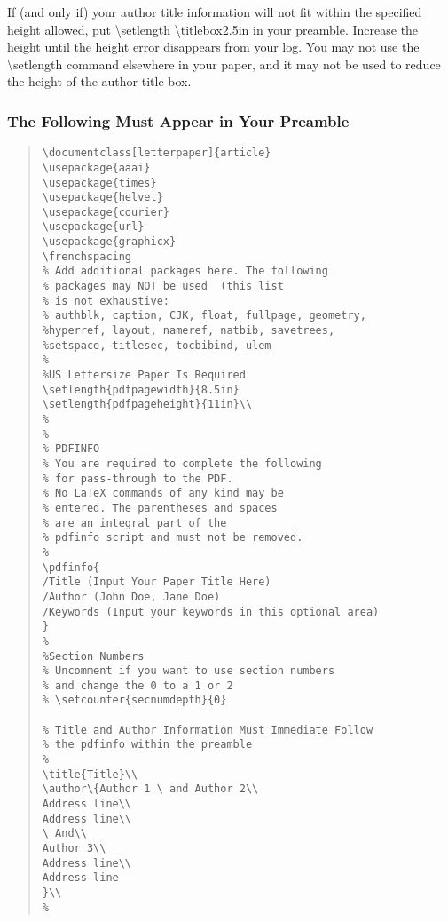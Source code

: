 \documentclass[letterpaper]{article} %
\begin{document}
If (and only if) your author title information will not fit within the specified  height allowed, put \textbackslash setlength \textbackslash titlebox{2.5in} in your preamble. Increase the height until the height error disappears from your log. You may not use the  \textbackslash setlength command elsewhere in your paper, and it may not be used to reduce the height of the author-title box.

\subsubsection{The Following Must Appear in Your Preamble}
\begin{quote}
\begin{scriptsize}\begin{verbatim}
\documentclass[letterpaper]{article}
\usepackage{aaai}
\usepackage{times}
\usepackage{helvet}
\usepackage{courier}
\usepackage{url}
\usepackage{graphicx}
\frenchspacing
% Add additional packages here. The following
% packages may NOT be used  (this list
% is not exhaustive:
% authblk, caption, CJK, float, fullpage, geometry,
%hyperref, layout, nameref, natbib, savetrees,
%setspace, titlesec, tocbibind, ulem
%
%US Lettersize Paper Is Required
\setlength{pdfpagewidth}{8.5in}
\setlength{pdfpageheight}{11in}\\
%
%
% PDFINFO
% You are required to complete the following
% for pass-through to the PDF.
% No LaTeX commands of any kind may be
% entered. The parentheses and spaces
% are an integral part of the
% pdfinfo script and must not be removed.
%
\pdfinfo{
/Title (Input Your Paper Title Here)
/Author (John Doe, Jane Doe)
/Keywords (Input your keywords in this optional area)
}
%
%Section Numbers
% Uncomment if you want to use section numbers
% and change the 0 to a 1 or 2
% \setcounter{secnumdepth}{0}

% Title and Author Information Must Immediate Follow
% the pdfinfo within the preamble
%
\title{Title}\\
\author\{Author 1 \ and Author 2\\
Address line\\
Address line\\
\ And\\
Author 3\\
Address line\\
Address line
}\\
%
\end{verbatim}\end{scriptsize}
\end{quote}
\end{document}
